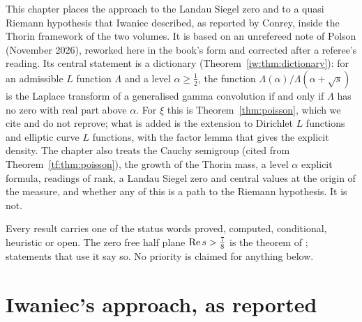 
This chapter places the approach to the Landau Siegel zero and to a quasi Riemann hypothesis that Iwaniec described, as reported by Conrey, inside the Thorin framework of the two volumes. It is based on an unrefereed note of Polson (November 2026), reworked here in the book's form and corrected after a referee's reading. Its central statement is a dictionary (Theorem~\ref{iw:thm:dictionary}): for an admissible $L$ function $\Lambda$ and a level $\alpha\ge\frac12$, the function $\Lambda(\alpha)/\Lambda(\alpha+\sqrt s)$ is the Laplace transform of a generalised gamma convolution if and only if $\Lambda$ has no zero with real part above $\alpha$. For $\xi$ this is Theorem~\ref{thm:poisson}, which we cite and do not reprove; what is added is the extension to Dirichlet $L$ functions and elliptic curve $L$ functions, with the factor lemma that gives the explicit density. The chapter also treats the Cauchy semigroup (cited from Theorem~\ref{tf:thm:poisson}), the growth of the Thorin mass, a level $\alpha$ explicit formula, readings of rank, a Landau Siegel zero and central values at the origin of the measure, and whether any of this is a path to the Riemann hypothesis. It is not.

Every result carries one of the status words proved, computed, conditional, heuristic or open. The zero free half plane $\operatorname{Re} s>\frac78$ is the theorem of \cite{OAI26a}; statements that use it say so. No priority is claimed for anything below.

\section{Iwaniec's approach, as reported}\label{iw:sec:approach}

